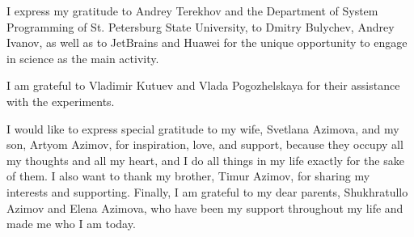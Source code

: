I express my gratitude to Andrey Terekhov and the Department of System Programming of St. Petersburg State University, to Dmitry Bulychev, Andrey Ivanov, as well as to JetBrains and Huawei for the unique opportunity to engage in science as the main activity.

I am grateful to Vladimir Kutuev and Vlada Pogozhelskaya for their assistance with the experiments.

I would like to express special gratitude to my wife, Svetlana Azimova, and my son, Artyom Azimov, for inspiration, love, and support, because they occupy all my thoughts and all my heart, and I do all things in my life exactly for the sake of them. I also want to thank my brother, Timur Azimov, for sharing my interests and supporting. Finally, I am grateful to my dear parents, Shukhratullo Azimov and Elena Azimova, who have been my support throughout my life and made me who I am today.
